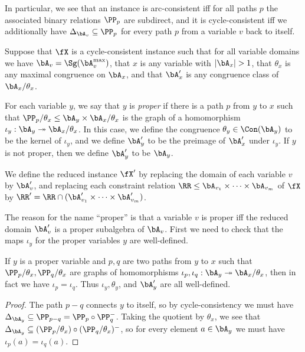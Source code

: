 In particular, we see that an instance is arc-consistent iff for all paths $p$ the associated binary relations $\PP_p$ are subdirect, and it is cycle-consistent iff we additionally have $\Delta_{\bA_v} \subseteq \PP_p$ for every path $p$ from a variable $v$ back to itself.

\begin{defn}\label{defn-proper-red} Suppose that $\fX$ is a cycle-consistent instance such that for all variable domains we have $\bA_v = \Sg(\bA_v^{\max})$, that $x$ is any variable with $|\bA_x| > 1$, that $\theta_x$ is any maximal congruence on $\bA_x$, and that $\bA_x'$ is any congruence class of $\bA_x/\theta_x$.

For each variable $y$, we say that $y$ is \emph{proper} if there is a path $p$ from $y$ to $x$ such that $\PP_p/\theta_x \le \bA_y \times \bA_x/\theta_x$ is the graph of a homomorphism $\iota_y : \bA_y \twoheadrightarrow \bA_x/\theta_x$. In this case, we define the congruence $\theta_y \in \Con(\bA_y)$ to be the kernel of $\iota_y$, and we define $\bA_y'$ to be the preimage of $\bA_x'$ under $\iota_y$. If $y$ is not proper, then we define $\bA_y'$ to be $\bA_y$.

We define the reduced instance $\fX'$ by replacing the domain of each variable $v$ by $\bA_v'$, and replacing each constraint relation $\RR \le \bA_{v_1} \times \cdots \times \bA_{v_m}$ of $\fX$ by $\RR' = \RR \cap (\bA_{v_1}' \times \cdots \times \bA_{v_m}')$.
\end{defn}

The reason for the name ``proper'' is that a variable $v$ is proper iff the reduced domain $\bA_v'$ is a proper subalgebra of $\bA_v$. First we need to check that the maps $\iota_y$ for the proper variables $y$ are well-defined.

\begin{lem} If $y$ is a proper variable and $p,q$ are two paths from $y$ to $x$ such that $\PP_p/\theta_x, \PP_q/\theta_x$ are graphs of homomorphisms $\iota_p, \iota_q : \bA_y \twoheadrightarrow \bA_x/\theta_x$, then in fact we have $\iota_p = \iota_q$. Thus $\iota_y, \theta_y$, and $\bA_y'$ are all well-defined.
\end{lem}
\begin{proof} The path $p-q$ connects $y$ to itself, so by cycle-consistency we must have $\Delta_{\bA_y} \subseteq \PP_{p-q} = \PP_p \circ \PP_q^-$. Taking the quotient by $\theta_x$, we see that $\Delta_{\bA_y} \subseteq (\PP_p/\theta_x) \circ (\PP_q/\theta_x)^-$, so for every element $a \in \bA_y$ we must have $\iota_p(a) = \iota_q(a)$.
\end{proof}

